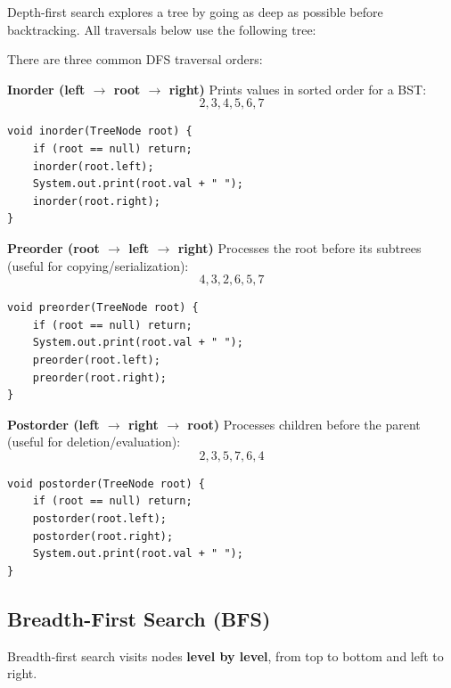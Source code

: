 Depth-first search explores a tree by going as deep as possible before backtracking.  
All traversals below use the following tree:

\begin{center}
\end{center}

There are three common DFS traversal orders:

\textbf{Inorder (left $\rightarrow$ root $\rightarrow$ right)}  
Prints values in sorted order for a BST:
\[
2, 3, 4, 5, 6, 7
\]

\begin{verbatim}
void inorder(TreeNode root) {
    if (root == null) return;
    inorder(root.left);
    System.out.print(root.val + " ");
    inorder(root.right);
}
\end{verbatim}

\textbf{Preorder (root $\rightarrow$ left $\rightarrow$ right)}  
Processes the root before its subtrees (useful for copying/serialization):
\[
4, 3, 2, 6, 5, 7
\]

\begin{verbatim}
void preorder(TreeNode root) {
    if (root == null) return;
    System.out.print(root.val + " ");
    preorder(root.left);
    preorder(root.right);
}
\end{verbatim}

\textbf{Postorder (left $\rightarrow$ right $\rightarrow$ root)}  
Processes children before the parent (useful for deletion/evaluation):
\[
2, 3, 5, 7, 6, 4
\]

\begin{verbatim}
void postorder(TreeNode root) {
    if (root == null) return;
    postorder(root.left);
    postorder(root.right);
    System.out.print(root.val + " ");
}
\end{verbatim}

\subsection{Breadth-First Search (BFS)}

Breadth-first search visits nodes \textbf{level by level}, from top to bottom and left to right.

